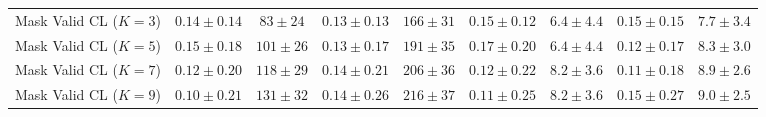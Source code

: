 \documentclass{uai2026} %
\newcommand{\1}{\mathbf{1}}
\begin{document}
\begin{table}[ht]
\begin{tabular}{@{}l|cc|cc|cc|cc@{}}
    Mask Valid CL ($K{=}3$)  & $0.14{\pm}0.14$               & $83{\pm}24$  & $0.13{\pm}0.13$ & $166{\pm}31$ & $0.15{\pm}0.12$ & $6.4{\pm}4.4$ & $0.15{\pm}0.15$ & $7.7{\pm}3.4$ \\
    Mask Valid CL ($K{=}5$)  & $0.15{\pm}0.18$               & $101{\pm}26$ & $0.13{\pm}0.17$ & $191{\pm}35$ & $0.17{\pm}0.20$ & $6.4{\pm}4.4$ & $0.12{\pm}0.17$ & $8.3{\pm}3.0$ \\
    Mask Valid CL ($K{=}7$)  & $0.12{\pm}0.20$               & $118{\pm}29$ & $0.14{\pm}0.21$ & $206{\pm}36$ & $0.12{\pm}0.22$ & $8.2{\pm}3.6$ & $0.11{\pm}0.18$ & $8.9{\pm}2.6$ \\
    Mask Valid CL ($K{=}9$)  & $0.10{\pm}0.21$               & $131{\pm}32$ & $0.14{\pm}0.26$ & $216{\pm}37$ & $0.11{\pm}0.25$ & $8.2{\pm}3.6$ & $0.15{\pm}0.27$ & $9.0{\pm}2.5$ \\
    \bottomrule
  \end{tabular}
\end{table}

\end{document}
